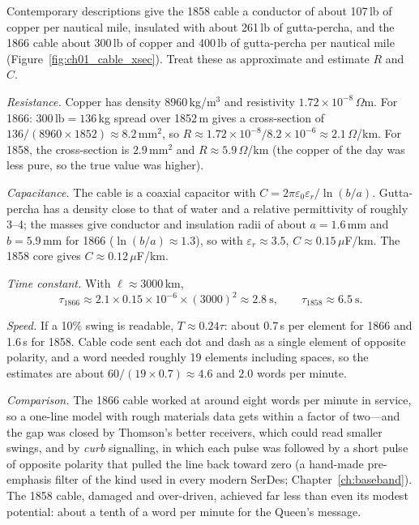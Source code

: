 

\begin{worked}
Contemporary descriptions give the 1858 cable a conductor of about 107\,lb of copper per nautical
mile, insulated with about 261\,lb of gutta-percha, and the 1866 cable about 300\,lb of copper and
400\,lb of gutta-percha per nautical mile (Figure~\ref{fig:ch01_cable_xsec}). Treat these as
approximate and estimate $R$ and $C$.

\emph{Resistance.} Copper has density 8960\,kg/m$^3$ and resistivity $1.72\times10^{-8}\,\Omega$m.
For 1866: $300\,\mathrm{lb}=136$\,kg spread over 1852\,m gives a cross-section of
$136/(8960\times1852)\approx8.2\,\mathrm{mm}^2$, so $R\approx1.72\times10^{-8}/8.2\times10^{-6}\approx
2.1\,\Omega$/km. For 1858, the cross-section is $2.9\,\mathrm{mm}^2$ and $R\approx5.9\,\Omega$/km (the
copper of the day was less pure, so the true value was higher).

\emph{Capacitance.} The cable is a coaxial capacitor with $C = 2\pi\varepsilon_0\varepsilon_r/\ln(b/a)$.
Gutta-percha has a density close to that of water and a relative permittivity of roughly 3--4;
the masses give conductor and insulation radii of about $a=1.6$\,mm and $b=5.9$\,mm for 1866
($\ln(b/a)\approx1.3$), so with $\varepsilon_r\approx3.5$, $C\approx0.15\,\mu$F/km. The 1858 core gives
$C\approx0.12\,\mu$F/km.

\emph{Time constant.} With $\ell\approx3000$\,km,
\[
\tau_{1866}\approx 2.1\times0.15\times10^{-6}\times(3000)^2\approx2.8\ \mathrm{s},\qquad
\tau_{1858}\approx 6.5\ \mathrm{s}.
\]

\emph{Speed.} If a 10\% swing is readable, $T\approx0.24\tau$: about 0.7\,s per element for 1866
and 1.6\,s for 1858. Cable code sent each dot and dash as a single element of opposite polarity,
and a word needed roughly 19 elements including spaces, so the estimates are about
$60/(19\times0.7)\approx4.6$ and $2.0$ words per minute.

\emph{Comparison.} The 1866 cable worked at around eight words per minute in service, so a
one-line model with rough materials data gets within a factor of two---and the gap was closed by
Thomson's better receivers, which could read smaller swings, and by \emph{curb} signalling, in
which each pulse was followed by a short pulse of opposite polarity that pulled the line back
toward zero (a hand-made pre-emphasis filter of the kind used in every modern SerDes;
Chapter~\ref{ch:baseband}). The 1858 cable, damaged and over-driven, achieved far less than even
its modest potential: about a tenth of a word per minute for the Queen's message.
\end{worked}

